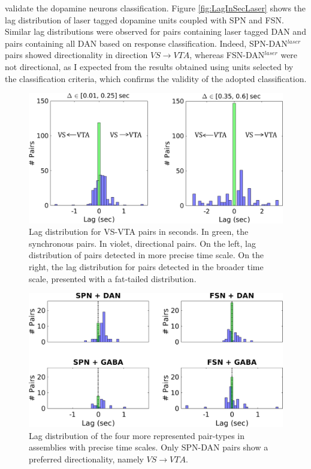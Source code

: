 validate the dopamine neurons classification. Figure \ref{fig:LagInSecLaser} shows the lag distribution of laser tagged dopamine units coupled with SPN and FSN. Similar lag distributions were observed for pairs containing laser tagged DAN and pairs containing all DAN based on response classification. Indeed, SPN-DAN$^{laser}$ pairs showed directionality in direction $VS\rightarrow VTA$, whereas FSN-DAN$^{laser}$ were not directional, as I expected from the results obtained using units selected by the classification criteria, which confirms the validity of the adopted classification.\\
\begin{figure}[H]
\centering
\includegraphics[scale=0.65]{figures/LagGeneral1.pdf}
\caption{Lag distribution for VS-VTA pairs in seconds. In green, the synchronous pairs. In violet, directional pairs. On the left, lag distribution of pairs detected in more precise time scale. On the right, the lag distribution for pairs detected in the broader time scale, presented with a fat-tailed distribution.}
\label{fig:LagInSecAll}
\end{figure}
\begin{figure}[H]
\centering
\includegraphics[scale=0.52]{figures/LagSec4Typo3VS.pdf}
\caption{Lag distribution of the four more represented pair-types in assemblies with precise time scales. Only SPN-DAN pairs show a preferred directionality, namely $VS\rightarrow VTA$.}
\label{fig:LagInSec4typo}
\end{figure}
